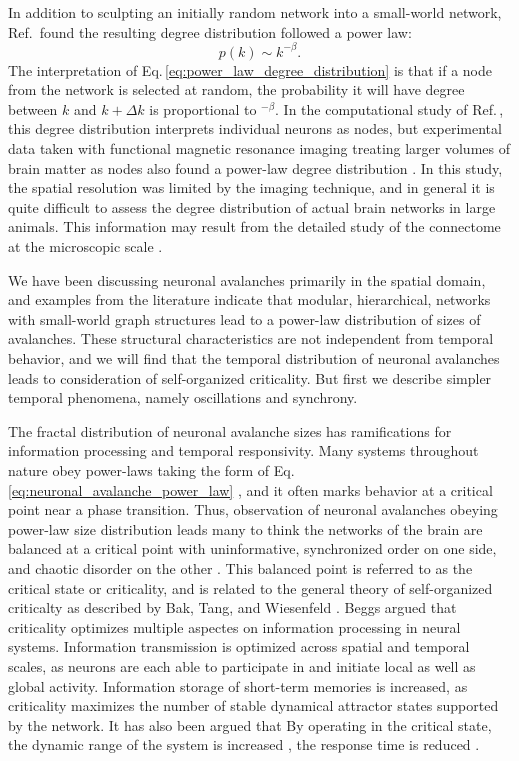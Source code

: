 In addition to sculpting an initially random network into a small-world network, Ref.\, found the resulting degree distribution followed a power law:
\begin{equation}
\label{eq:power_law_degree_distribution}
p(k) \sim k^{-\beta}.
\end{equation}
The interpretation of Eq.\,\ref{eq:power_law_degree_distribution} is that if a node from the network is selected at random, the probability it will have degree between $k$ and $k+\Delta k$ is proportional to $^{-\beta}$. In the computational study of Ref.\,, this degree distribution interprets individual neurons as nodes, but experimental data taken with functional magnetic resonance imaging treating larger volumes of brain matter as nodes also found a power-law degree distribution \cite{egch2005}. In this study, the spatial resolution was limited by the imaging technique, and in general it is quite difficult to assess the degree distribution of actual brain networks in large animals. This information may result from the detailed study of the connectome at the microscopic scale \cite{http://www.humanconnectomeproject.org/}.
   
We have been discussing neuronal avalanches primarily in the spatial domain, and examples from the literature indicate that modular, hierarchical, networks with small-world graph structures lead to a power-law distribution of sizes of avalanches. These structural characteristics are not independent from temporal behavior, and we will find that the temporal distribution of neuronal avalanches leads to consideration of self-organized criticality. But first we describe simpler temporal phenomena, namely oscillations and synchrony.

The fractal distribution of neuronal avalanche sizes has ramifications for information processing and temporal responsivity. Many systems throughout nature obey power-laws taking the form of Eq.\,\ref{eq:neuronal_avalanche_power_law} \cite{ba2005_baks_book,dover_book_on_fractals}, and it often marks behavior at a critical point near a phase transition. Thus, observation of neuronal avalanches obeying power-law size distribution leads many to think the networks of the brain are balanced at a critical point with uninformative, synchronized order on one side, and chaotic disorder on the other \cite{be2007}. This balanced point is referred to as the critical state or criticality, and is related to the general theory of self-organized criticalty as described by Bak, Tang, and Wiesenfeld \cite{bata1987,bata1988,ba2005}. Beggs argued \cite{be2008} that criticality optimizes multiple aspectes on information processing in neural systems. Information transmission is optimized across spatial and temporal scales, as neurons are each able to participate in and initiate local as well as global activity. Information storage of short-term memories is increased, as criticality maximizes the number of stable dynamical attractor states supported by the network. It has also been argued that  By operating in the critical state, the dynamic range of the system is increased \cite{kico2006,shya2009}, the response time is reduced \cite{}.

